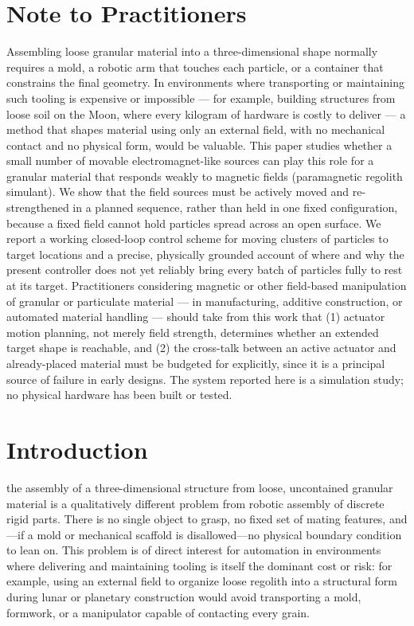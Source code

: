 \documentclass[journal]{IEEEtran}
\begin{document}
\section*{Note to Practitioners}
Assembling loose granular material into a three-dimensional shape normally
requires a mold, a robotic arm that touches each particle, or a container
that constrains the final geometry. In environments where transporting or
maintaining such tooling is expensive or impossible --- for example,
building structures from loose soil on the Moon, where every kilogram of
hardware is costly to deliver --- a method that shapes material using only
an external field, with no mechanical contact and no physical form, would be
valuable. This paper studies whether a small number of movable
electromagnet-like sources can play this role for a granular material that
responds weakly to magnetic fields (paramagnetic regolith simulant). We show
that the field sources must be actively moved and re-strengthened in a
planned sequence, rather than held in one fixed configuration, because a
fixed field cannot hold particles spread across an open surface. We report a
working closed-loop control scheme for moving clusters of particles to
target locations and a precise, physically grounded account of where and
why the present controller does not yet reliably bring every batch of
particles fully to rest at its target. Practitioners considering
magnetic or other field-based manipulation of granular or particulate
material --- in manufacturing, additive construction, or automated material
handling --- should take from this work that (1) actuator motion planning,
not merely field strength, determines whether an extended target shape is
reachable, and (2) the cross-talk between an active actuator and
already-placed material must be budgeted for explicitly, since it is a
principal source of failure in early designs. The system reported here is a
simulation study; no physical hardware has been built or tested.

\IEEEpeerreviewmaketitle

\section{Introduction}
 the assembly of a three-dimensional structure
from loose, uncontained granular material is a qualitatively different
problem from robotic assembly of discrete rigid parts. There is no single
object to grasp, no fixed set of mating features, and---if a mold or
mechanical scaffold is disallowed---no physical boundary condition to lean
on. This problem is of direct interest for automation in environments where
delivering and maintaining tooling is itself the dominant cost or risk: for
example, using an external field to organize loose regolith into a
structural form during lunar or planetary construction would avoid
transporting a mold, formwork, or a manipulator capable of contacting every
grain.
\end{document}
